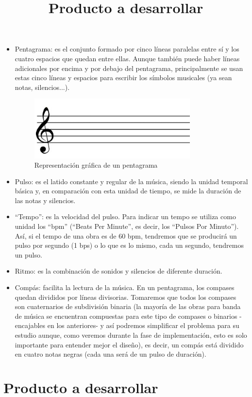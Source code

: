 \begin{itemize}
\item Pentagrama: es el conjunto formado por cinco líneas paralelas entre sí y los cuatro espacios que quedan entre ellas. Aunque también puede haber líneas adicionales por encima y por debajo del pentagrama, principalmente se usan estas cinco líneas y espacios para escribir los símbolos musicales (ya sean notas, silencios...).
  \begin{figure}[htb]
  \centering
  \includegraphics[width=0.8\textwidth]{./imagenes/pentagrama}
  \caption{Representación gráfica de un pentagrama} \label{fig:pentagrama}
  \end{figure}
\item Pulso: es el latido constante y regular de la música, siendo la unidad temporal básica y, en comparación con esta unidad de tiempo, se mide la duración de las notas y silencios.
\item “Tempo”: es la velocidad del pulso. Para indicar un tempo se utiliza como unidad los “bpm” (“Beats Per Minute”, es decir, los “Pulsos Por Minuto”). Así, si el tempo de una obra es de 60 bpm, tendremos que se producirá un pulso por segundo (1 bps) o lo que es lo mismo, cada un segundo, tendremos un pulso.
\item Ritmo: es la combinación de sonidos y silencios de diferente duración.
\item Compás: facilita la lectura de la música. En un pentagrama, los compases quedan divididos por líneas divisorias. Tomaremos que todos los compases son cuaternarios de subdivisión binaria (la mayoría de las obras para banda de música se encuentran compuestas para este tipo de compases o binarios -encajables en los anteriores- y así podremos simplificar el problema para su estudio aunque, como veremos durante la fase de implementación, esto es solo importante para entender mejor el diseño), es decir, un compás está dividido en cuatro notas negras (cada una será de un pulso de duración).
\end{itemize}

\title{Producto a desarrollar}
\section{Producto a desarrollar}

